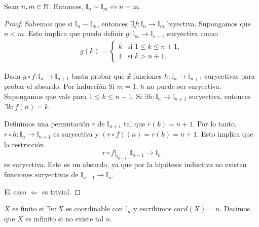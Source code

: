 \begin{theorem}
    Sean \(n, m \in \mathbb{N} \). Entonces, \(\mathbb{I}_n \sim \mathbb{I}_m \iff n = m\).
    \begin{proof}
        Sabemos que si \(\mathbb{I}_n \sim \mathbb{I}_m\), entonces \(\exists f: \mathbb{I}_n \to \mathbb{I}_m\) biyectiva. Supongamos que \(n < m\). Esto implica que puedo definir \(g: \mathbb{I}_m \to \mathbb{I}_{n+1} \) suryectiva como:
        \begin{align*}
            g(k) =
            \begin{cases}
                k & \text{si } 1 \leq k \leq n+1, \\
                1 & \text{si } k > n+1.
            \end{cases}
        \end{align*}

        Dada \(g \circ f: \mathbb{I}_n \to \mathbb{I}_{n+1} \) basta probar que \(\nexists\) funciones \(h: \mathbb{I}_n \to \mathbb{I}_{n+1} \) suryectivas para probar el absurdo. Por inducción
        Si \(m = 1\), \(h\) no puede ser suryectiva. Supongamos que vale para \(1 \leq k \leq n-1\). Si \(\exists h: \mathbb{I}_n \to \mathbb{I}_{n+1} \) suryectiva, entonces \(\exists k : f(n) = k\).

        Definimos una permutación \(r\) de \(\mathbb{I}_{n+1} \) tal que \(r(k) = n+1\). Por lo tanto, \(r \circ h: \mathbb{I}_n \to \mathbb{I}_{n+1} \) es suryectiva y \((r \circ f)(n) = r(k) = n+1\). Esto implica que la restricción
        \[
            r \circ f|_{\mathbb{I}_{n-1}} : \mathbb{I}_{n-1} \to \mathbb{I}_n
        \]
        es suryectiva. Esto es un absurdo, ya que por la hipótesis inductiva no existen funciones suryectivas de \(\mathbb{I}_{n-1} \to \mathbb{I}_n\).

        El caso \(\Leftarrow\) es trivial.
    \end{proof}
\end{theorem}

\begin{definition}
    \(X \) es finito si \(\exists n: X \) es coordinable con \(\mathbb{I}_n\) y escribimos \(card(X)=n\). Decimos que \(X\) es infinito si no existe tal \(n\).
\end{definition}
